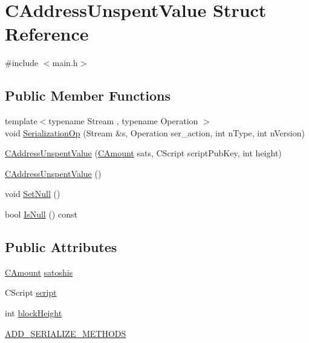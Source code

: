 \hypertarget{struct_c_address_unspent_value}{}\section{C\+Address\+Unspent\+Value Struct Reference}
\label{struct_c_address_unspent_value}


{\ttfamily \#include $<$main.\+h$>$}

\subsection*{Public Member Functions}
\begin{DoxyCompactItemize}
\item 
{\footnotesize template$<$typename Stream , typename Operation $>$ }\\void \mbox{\hyperlink{struct_c_address_unspent_value_a370b5519a7bb4044b86c6b8f20a70fc8}{Serialization\+Op}} (Stream \&s, Operation ser\+\_\+action, int n\+Type, int n\+Version)
\item 
\mbox{\hyperlink{struct_c_address_unspent_value_a9096c964d38bdc8bc479feec29d0529e}{C\+Address\+Unspent\+Value}} (\mbox{\hyperlink{amount_8h_a4eaf3a5239714d8c45b851527f7cb564}{C\+Amount}} sats, C\+Script script\+Pub\+Key, int height)
\item 
\mbox{\hyperlink{struct_c_address_unspent_value_aaf389144f1cd076222554e74a4712be5}{C\+Address\+Unspent\+Value}} ()
\item 
void \mbox{\hyperlink{struct_c_address_unspent_value_af6f23f223f1952180d3c43a15c60b030}{Set\+Null}} ()
\item 
bool \mbox{\hyperlink{struct_c_address_unspent_value_a8b4914864eda380737ba3d7fe8219367}{Is\+Null}} () const
\end{DoxyCompactItemize}
\subsection*{Public Attributes}
\begin{DoxyCompactItemize}
\item 
\mbox{\hyperlink{amount_8h_a4eaf3a5239714d8c45b851527f7cb564}{C\+Amount}} \mbox{\hyperlink{struct_c_address_unspent_value_ac3bf4ba471ae1cf0d598e549a795209a}{satoshis}}
\item 
C\+Script \mbox{\hyperlink{struct_c_address_unspent_value_a0e3d5ce980dffae8eab06546dd69d869}{script}}
\item 
int \mbox{\hyperlink{struct_c_address_unspent_value_a9450106935649cd974daddb224eb886e}{block\+Height}}
\item 
\mbox{\hyperlink{struct_c_address_unspent_value_a4a6e5c849fef969046bf31a14ad9e13d}{A\+D\+D\+\_\+\+S\+E\+R\+I\+A\+L\+I\+Z\+E\+\_\+\+M\+E\+T\+H\+O\+DS}}
\end{DoxyCompactItemize}


